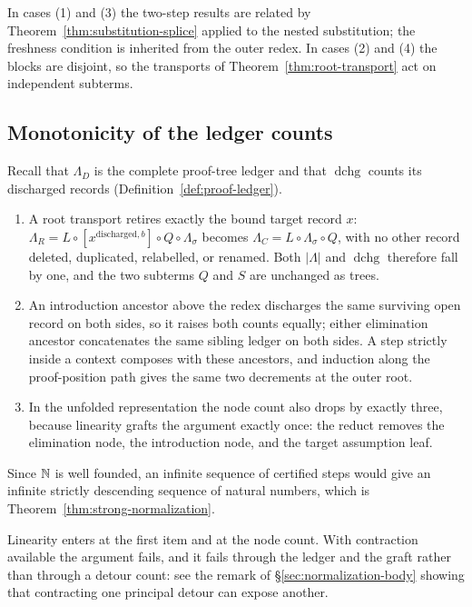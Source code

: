 In cases (1) and (3) the two-step results are related by
Theorem~\ref{thm:substitution-splice} applied to the nested substitution; the freshness
condition is inherited from the outer redex.  In cases (2) and (4) the blocks are disjoint, so
the transports of Theorem~\ref{thm:root-transport} act on independent subterms.

\subsection{Monotonicity of the ledger counts}

Recall that $\Lambda_D$ is the complete proof-tree ledger and that $\operatorname{dchg}$ counts
its discharged records (Definition~\ref{def:proof-ledger}).

\begin{enumerate}
\item A root transport retires exactly the bound target record $x$:
  $\Lambda_R=L\circ[x^{\mathrm{discharged},b}]\circ Q\circ\Lambda_\sigma$ becomes
  $\Lambda_C=L\circ\Lambda_\sigma\circ Q$, with no other record deleted, duplicated,
  relabelled, or renamed.  Both $|\Lambda|$ and $\operatorname{dchg}$ therefore fall by one,
  and the two subterms $Q$ and $S$ are unchanged as trees.
\item An introduction ancestor above the redex discharges the same surviving open record on
  both sides, so it raises both counts equally; either elimination ancestor concatenates the
  same sibling ledger on both sides.  A step strictly inside a context composes with these
  ancestors, and induction along the proof-position path gives the same two decrements at
  the outer root.
\item In the unfolded representation the node count also drops by exactly three, because
  linearity grafts the argument exactly once: the reduct removes the elimination node, the
  introduction node, and the target assumption leaf.
\end{enumerate}

Since $\mathbb{N}$ is well founded, an infinite sequence of certified steps would give an infinite
strictly descending sequence of natural numbers, which is
Theorem~\ref{thm:strong-normalization}.

Linearity enters at the first item and at the node count.  With contraction available the
argument fails, and it fails through the ledger and the graft rather than through a detour
count: see the remark of \S\ref{sec:normalization-body} showing that contracting one
principal detour can expose another.

